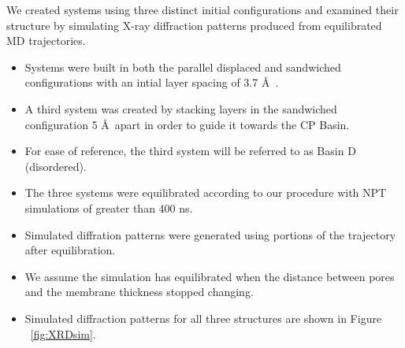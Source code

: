 \documentclass{article}
\newcommand{\angstrom}{\textup{\AA}}
\begin{document}
  We created systems using three 
  distinct initial configurations and examined their structure by simulating 
  X-ray diffraction patterns produced from equilibrated MD trajectories.
  \begin{itemize}
  	\item Systems were built in both the parallel displaced and sandwiched 
	configurations with an intial layer spacing of 3.7 \angstrom~.
	\item A third system was created by stacking layers in the sandwiched 
	configuration 5 \angstrom~apart in order to guide it towards the CP Basin.
	\item For ease of reference, the third system will be referred to as Basin D (disordered). 
	\item The three systems were equilibrated according to our procedure with
	NPT simulations of greater than 400 ns.
	\item Simulated diffration patterns were generated using portions of the
	trajectory after equilibration.  
	\item We assume the simulation has equilibrated when the distance between 
	pores and the membrane thickness stopped changing.
	\item Simulated diffraction patterns for all three structures are shown in 
	Figure ~\ref{fig:XRDsim}. 
  \end{itemize}
\end{document}
